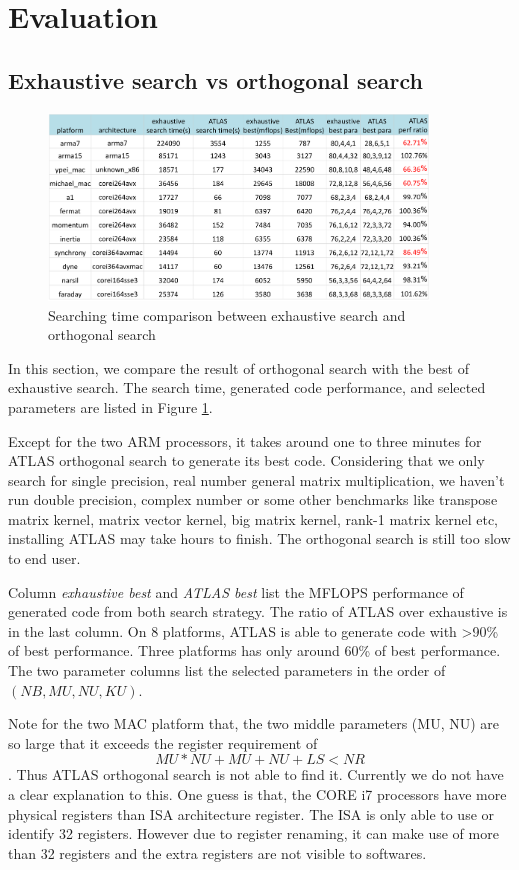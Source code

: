 \section{Evaluation}
\label{sec:evaluation}

  \subsection{Exhaustive search vs \atl orthogonal search}
  \label{sec:exhaustiveVSorthogonal}
  \begin{figure}[tbhp]
    \centering
    \includegraphics[width=0.9\textwidth]{images/exhaustiveVsorthogonal.png}
    \caption{Searching time comparison between exhaustive search and \atl orthogonal search}
    \label{fig:exhaustiveVsorthogonal}
  \end{figure}
  In this section, we compare the result of \atl orthogonal search with the best of exhaustive
  search. The search time, generated code performance, and selected parameters are listed in Figure
  \ref{fig:exhaustiveVsorthogonal}.\par
  Except for the two ARM processors, it takes around one to three minutes for ATLAS orthogonal search
  to generate its best code. Considering that we only search for single precision, real number general
  matrix multiplication, we haven't run double precision, complex number or some other benchmarks
  like transpose matrix kernel, matrix vector kernel, big matrix kernel, rank-1 matrix kernel etc, installing
  ATLAS may take hours to finish. The orthogonal search is still too slow to end user.\par
  Column \textit{exhaustive best} and \textit{ATLAS best} list the MFLOPS performance of generated code from
  both search strategy. The ratio of ATLAS over exhaustive is in the last column. On 8 platforms,
  ATLAS is able to generate code with >90\% of best performance. Three platforms has only around 60\% of
  best performance. The two parameter columns list the selected parameters in the order of $(NB, MU, NU, KU)$.\par
  Note for the two MAC platform that, the two middle parameters (MU, NU) are so large that it exceeds
  the register requirement of \[ MU*NU + MU + NU + LS < NR \]. Thus ATLAS orthogonal search is not able
  to find it. Currently we do not have a clear explanation to this. One guess is that, the CORE i7 processors
  have more physical registers than ISA architecture register. The ISA is only able to use or identify 32 registers.
  However due to register renaming, it can make use of more than 32 registers and the extra registers are not visible
  to softwares.\par

